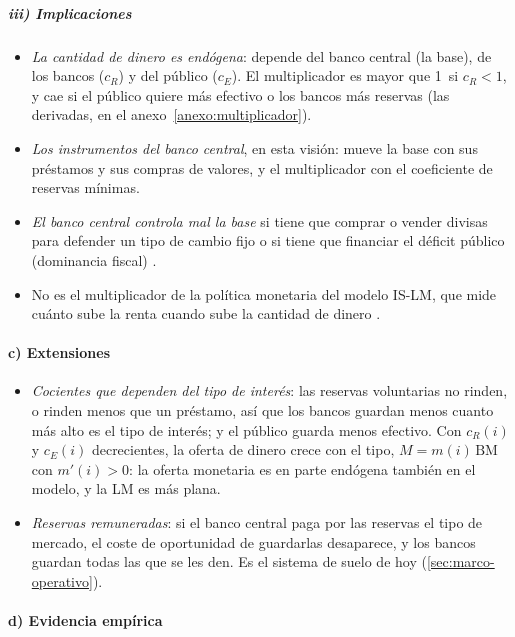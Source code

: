 \documentclass[11pt]{article}
\begin{document}
\subparagraph{iii) Implicaciones}

\begin{itemize}
\item \emph{La cantidad de dinero es endógena}: depende del banco central (la base), de los bancos ($c_R$) y del público ($c_E$). El multiplicador es mayor que 1~si $c_R<1$, y cae si el público quiere más efectivo o los bancos más reservas (las derivadas, en el anexo~\ref{anexo:multiplicador}).
\item \emph{Los instrumentos del banco central}, en esta visión: mueve la base con sus préstamos y sus compras de valores, y el multiplicador con el coeficiente de reservas mínimas.
\item \emph{El banco central controla mal la base} si tiene que comprar o vender divisas para defender un tipo de cambio fijo  o si tiene que financiar el déficit público (dominancia fiscal) .
\item No es el multiplicador de la política monetaria del modelo IS-LM, que mide cuánto sube la renta cuando sube la cantidad de dinero .
\end{itemize}

\paragraph{c) Extensiones}

\begin{itemize}
\item \emph{Cocientes que dependen del tipo de interés}: las reservas voluntarias no rinden, o rinden menos que un préstamo, así que los bancos guardan menos cuanto más alto es el tipo de interés; y el público guarda menos efectivo. Con $c_R(i)$ y $c_E(i)$ decrecientes, la oferta de dinero crece con el tipo, $M=m(i)\,\mathrm{BM}$ con $m'(i)>0$: la oferta monetaria es en parte endógena también en el modelo, y la LM es más plana.
\item \emph{Reservas remuneradas}: si el banco central paga por las reservas el tipo de mercado, el coste de oportunidad de guardarlas desaparece, y los bancos guardan todas las que se les den. Es el sistema de suelo de hoy (\ref{sec:marco-operativo}).
\end{itemize}

\paragraph{d) Evidencia empírica}
\end{document}
